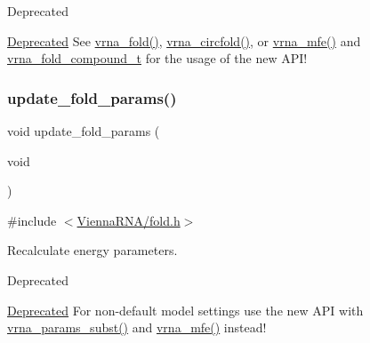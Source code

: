 \begin{DoxyRefDesc}{Deprecated}
\item[\hyperlink{deprecated__deprecated000073}{Deprecated}]See \hyperlink{group__mfe__fold__single_ga29a33b2895f4e67b0480271ff289afdc}{vrna\+\_\+fold()}, \hyperlink{group__mfe__fold__single_gaf973483d8acbc8cc9aacfc8a9b7f0074}{vrna\+\_\+circfold()}, or \hyperlink{group__mfe__fold_gabd3b147371ccf25c577f88bbbaf159fd}{vrna\+\_\+mfe()} and \hyperlink{group__fold__compound_ga1b0cef17fd40466cef5968eaeeff6166}{vrna\+\_\+fold\+\_\+compound\+\_\+t} for the usage of the new A\+P\+I!\end{DoxyRefDesc}
\mbox{\label{group__mfe__fold__single_ga41bf8f6fa15b94471f7095cad9f0ccf3}} 
\subsubsection{\texorpdfstring{update\+\_\+fold\+\_\+params()}{update\_fold\_params()}}
{\footnotesize\ttfamily void update\+\_\+fold\+\_\+params (\begin{DoxyParamCaption}\item[{void}]{ }\end{DoxyParamCaption})}



{\ttfamily \#include $<$\hyperlink{fold_8h}{Vienna\+R\+N\+A/fold.\+h}$>$}



Recalculate energy parameters. 

\begin{DoxyRefDesc}{Deprecated}
\item[\hyperlink{deprecated__deprecated000074}{Deprecated}]For non-\/default model settings use the new A\+PI with \hyperlink{group__energy__parameters_ga5d1909208f7ea3baa98b75afaa1f62ca}{vrna\+\_\+params\+\_\+subst()} and \hyperlink{group__mfe__fold_gabd3b147371ccf25c577f88bbbaf159fd}{vrna\+\_\+mfe()} instead!\end{DoxyRefDesc}
\mbox{\label{group__mfe__fold__single_gae66dc422efb8f5d56717d92d6002a9f8}} 
